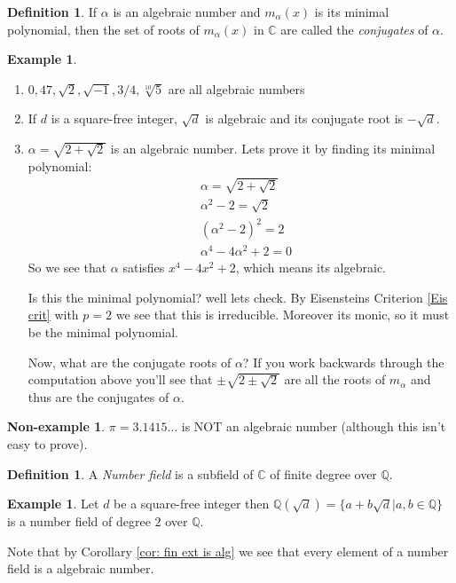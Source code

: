\documentclass[11pt,a4paper]{report}
\theoremstyle{plain}
\theoremstyle{definition}
\newtheorem{defn}[subsection]{Definition}
\newtheorem{exmp}[subsection]{Example}
\newtheorem{nexmp}[subsection]{Non-example}
\theoremstyle{definition}
\def\CC{\mathbb{C}}
\def\QQ{\mathbb{Q}}
\def \a{\alpha}
\begin{document}
	\begin{defn}
		If $\a$ is an algebraic number and $m_\a(x)$ is its minimal polynomial, then the set of roots of $m_\a(x)$ in $\CC$ are called the \textit{conjugates} of $\a$.
	\end{defn}
	
	
	
	
	\begin{exmp}
		\begin{enumerate}
			\item $0,47,\sqrt{2},\sqrt{-1},3/4, \sqrt[10]{5}$ are all algebraic numbers
			\item If $d$ is a square-free integer, $\sqrt{d}$ is algebraic and its conjugate root is $-\sqrt{d}$. 
			
			\item $\a=\sqrt{2+\sqrt{2}}$ is an algebraic number. Lets prove it by finding its minimal polynomial:	
			\begin{align}
				&\a=\sqrt{2+\sqrt{2}}\\
				&\a^2-2= \sqrt{2}\\
				&(\a^2-2)^2=2\\
				&\a^4-4\a^2+2=0
			\end{align}
			So we see that $\a$ satisfies $x^4-4x^2+2$, which means its algebraic. 
			
			Is this the minimal polynomial? well lets check. By Eisensteins Criterion \ref{Eis crit} with $p=2$ we see that this is irreducible. Moreover its monic, so it must be the minimal polynomial.
			
			Now, what are the conjugate roots of $\a$? If you work backwards through the computation above you'll see that $\pm \sqrt{2 \pm \sqrt{2}}$ are all the roots of $m_\a$ and thus are the conjugates of $\a$.
		\end{enumerate}
		
		
	\end{exmp}
	
	\begin{nexmp}
		$\pi=3.1415\dots$ is NOT an algebraic number (although this isn't easy to prove).
	\end{nexmp}
	
	\begin{defn}
		A \textit{Number field} is a subfield of $\CC$ of finite degree over $\QQ$.
	\end{defn}	
	
	\begin{exmp}
		Let $d$ be a square-free integer then $\QQ(\sqrt{d})=\{a+b\sqrt{d}| a,b \in \QQ\}$ is a number field of degree $2$ over $\QQ$. 
	\end{exmp}
	Note that by Corollary \ref{cor: fin ext is alg} we see that every element of a number field is a algebraic number.
	
\end{document}
